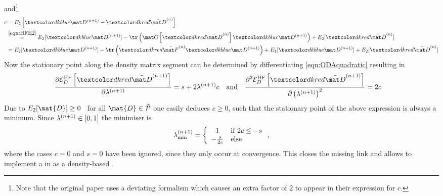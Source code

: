 and\footnote{Note that the original paper \cite{Cances2000a} uses a deviating formalism %
which causes an extra factor of $2$ to appear in their expression for $c$.}
\begin{equation}
\begin{aligned}
	c &= E_2\left[ \Pe{n+1} - \Pet{n} \right] \\
	&\stackrel{\eqref{eqn:HFE2}}{=}
		E_2 [\Pe{n+1}] - \tr\left( \Gfct{\Pet{n}} \Pe{n+1} \right) + E_2 [\Pet{n}] \\
	&= E_2 [\Pe{n+1}] - \tr \left( \Fot{n} \Pe{n+1} \right) + E_1[\Pe{n+1}] + E_2 [\Pet{n}]
\end{aligned}
\label{eqn:ODAc}
\end{equation}
Now the stationary point along the density matrix segment
can be determined by differentiating \eqref{eqn:ODAquadratic} resulting in
\begin{align*}
	\frac{\partial \EHFD{\Pet{n+1}}}{\partial \la{n+1}}
	&= s + 2 \la{n+1} c
	&&\text{and}&
	\frac{\partial^2 \EHFD{\Pet{n+1}}}{\partial \left(\la{n+1}\right)^2} &= 2c
\end{align*}
Due to $E_2[\mat{D}] \geq 0$~\cite{Cances2000a} for all $\mat{D} \in \tilde{\mathcal{P}}$
one easily deduces $c \geq 0$,
such that the stationary point of the above expression is always a minimum.
Since $\lambda^{(n+1)} \in [0,1]$ the minimiser is
\begin{equation}
	\label{eqn:ODALambdaOpt}
	\lambda^{(n+1)}_\text{min} = \left\{
	\begin{array}{cl}
		1 & \text{if $2c \leq -s$} \\
		- \frac{s}{2c} & \text{else}
	\end{array}
	\right.,
\end{equation}
where the cases $c=0$ and $s=0$ have been ignored, since they only occur at convergence.
This closes the missing link and allows to implement a \ODA
in as a density-based \SCF.

